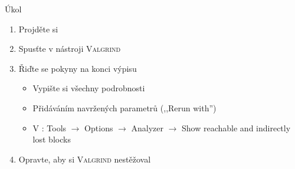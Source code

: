 \begin{frame}{Úkol}

  \begin{enumerate}
    \iffimuni
      \item Projděte si 
    \fi
    \item Spusťte  v nástroji \textsc{Valgrind}

    \iffimuni{} \fi

    \item Řiďte se pokyny na konci výpisu
    \begin{itemize}
      \item Vypište si všechny podrobnosti
      \item Přidáváním navržených parametrů (,,Rerun with'')
      \iffimuni\else
	\item V \qtcu: Tools $\rightarrow$ Options $\rightarrow$ Analyzer
	  $\rightarrow$ Show reachable and indirectly lost blocks
      \fi
    \end{itemize}

    \item Opravte, aby si \textsc{Valgrind} nestěžoval
  \end{enumerate}

\end{frame}

